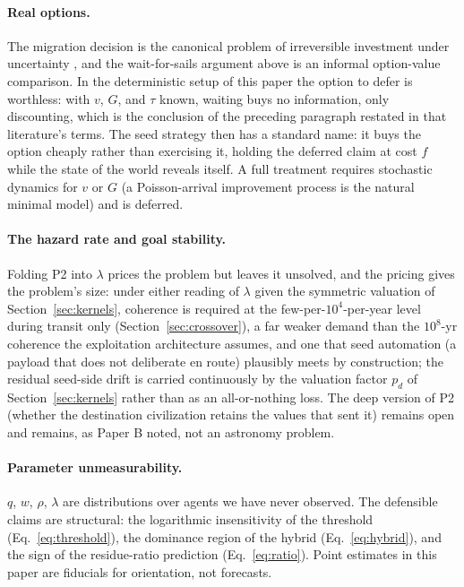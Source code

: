 \documentclass[11pt]{article}
\begin{document}
\paragraph{Real options.} The migration decision is the canonical problem of irreversible investment under uncertainty \citep{McDonaldSiegel1986,DixitPindyck1994}, and the wait-for-sails argument above is an informal option-value comparison. In the deterministic setup of this paper the option to defer is worthless: with $v$, $G$, and $\tau$ known, waiting buys no information, only discounting, which is the conclusion of the preceding paragraph restated in that literature's terms. The seed strategy then has a standard name: it buys the option cheaply rather than exercising it, holding the deferred claim at cost $f$ while the state of the world reveals itself. A full treatment requires stochastic dynamics for $v$ or $G$ (a Poisson-arrival improvement process is the natural minimal model) and is deferred.

\paragraph{The hazard rate and goal stability.} Folding P2 into $\lambda$ prices the problem but leaves it unsolved, and the pricing gives the problem's size: under either reading of $\lambda$ given the symmetric valuation of Section~\ref{sec:kernels}, coherence is required at the few-per-$10^{4}$-per-year level during transit only (Section~\ref{sec:crossover}), a far weaker demand than the $10^{8}$-yr coherence the exploitation architecture assumes, and one that seed automation (a payload that does not deliberate en route) plausibly meets by construction; the residual seed-side drift is carried continuously by the valuation factor $p_{d}$ of Section~\ref{sec:kernels} rather than as an all-or-nothing loss. The deep version of P2 (whether the destination civilization retains the values that sent it) remains open and remains, as Paper B noted, not an astronomy problem.

\paragraph{Parameter unmeasurability.} $q$, $w$, $\rho$, $\lambda$ are distributions over agents we have never observed. The defensible claims are structural: the logarithmic insensitivity of the threshold (Eq.~\ref{eq:threshold}), the dominance region of the hybrid (Eq.~\ref{eq:hybrid}), and the sign of the residue-ratio prediction (Eq.~\ref{eq:ratio}). Point estimates in this paper are fiducials for orientation, not forecasts.
\end{document}
